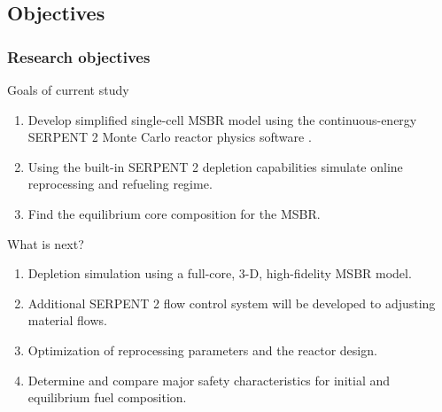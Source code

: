 \subsection{Objectives}
\begin{frame}
  \frametitle{Research objectives}
                  \vspace*{-0.1in}
              \begin{block}{Goals of current study}
               \begin{enumerate}
                \item Develop simplified single-cell \gls{MSBR} model using the continuous-energy SERPENT 2 Monte Carlo reactor
					physics software \cite{leppanen_serpent_2012}.
                \item Using the built-in SERPENT 2 depletion  capabilities simulate online reprocessing and refueling regime.
                \item Find the equilibrium core composition for the \gls{MSBR}.
               \end{enumerate}
               \end{block}
               
               \begin{block}{What is next?}
               \begin{enumerate}
                \item Depletion simulation using a full-core, 3-D, high-fidelity \gls{MSBR} model.
                \item Additional SERPENT 2 flow control system will be developed to adjusting material flows.
                \item Optimization of reprocessing parameters and the reactor design.
                \item Determine and compare major safety characteristics for initial and equilibrium fuel composition.
               \end{enumerate}
               \end{block}

\end{frame}

